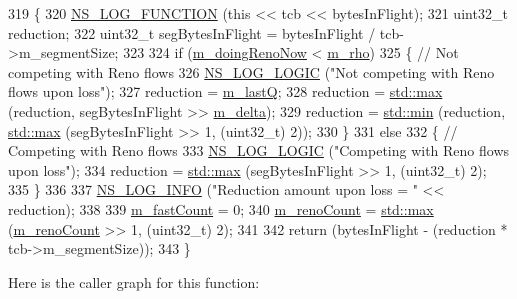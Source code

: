 \begin{DoxyCode}
319 \{
320   \hyperlink{log-macros-disabled_8h_a90b90d5bad1f39cb1b64923ea94c0761}{NS\_LOG\_FUNCTION} (\textcolor{keyword}{this} << tcb << bytesInFlight);
321   uint32\_t reduction;
322   uint32\_t segBytesInFlight = bytesInFlight / tcb->m\_segmentSize;
323 
324   \textcolor{keywordflow}{if} (\hyperlink{classns3_1_1TcpYeah_ad70d5e4310bd47c13bdfe5a665a4a911}{m\_doingRenoNow} < \hyperlink{classns3_1_1TcpYeah_ada328f61ed71f07744835de4bf78927c}{m\_rho})
325     \{ \textcolor{comment}{// Not competing with Reno flows}
326       \hyperlink{group__logging_ga88acd260151caf2db9c0fc84997f45ce}{NS\_LOG\_LOGIC} (\textcolor{stringliteral}{"Not competing with Reno flows upon loss"});
327       reduction = \hyperlink{classns3_1_1TcpYeah_a6bea8f785d16df35d447ba70b4464fb9}{m\_lastQ};
328       reduction = \hyperlink{80211b_8c_affe776513b24d84b39af8ab0930fef7f}{std::max} (reduction, segBytesInFlight >> \hyperlink{classns3_1_1TcpYeah_af36b0f4c1017a437469d909a22650f84}{m\_delta});
329       reduction = \hyperlink{80211b_8c_ac6afabdc09a49a433ee19d8a9486056d}{std::min} (reduction, \hyperlink{80211b_8c_affe776513b24d84b39af8ab0930fef7f}{std::max} (segBytesInFlight >> 1, (uint32\_t) 2));
330     \}
331   \textcolor{keywordflow}{else}
332     \{ \textcolor{comment}{// Competing with Reno flows}
333       \hyperlink{group__logging_ga88acd260151caf2db9c0fc84997f45ce}{NS\_LOG\_LOGIC} (\textcolor{stringliteral}{"Competing with Reno flows upon loss"});
334       reduction = \hyperlink{80211b_8c_affe776513b24d84b39af8ab0930fef7f}{std::max} (segBytesInFlight >> 1, (uint32\_t) 2);
335     \}
336 
337   \hyperlink{group__logging_gafbd73ee2cf9f26b319f49086d8e860fb}{NS\_LOG\_INFO} (\textcolor{stringliteral}{"Reduction amount upon loss = "} << reduction);
338 
339   \hyperlink{classns3_1_1TcpYeah_adec63c13d5f8b6677008aa5209437483}{m\_fastCount} = 0;
340   \hyperlink{classns3_1_1TcpYeah_a23724f2976fedf0c221ebad49a54487c}{m\_renoCount} = \hyperlink{80211b_8c_affe776513b24d84b39af8ab0930fef7f}{std::max} (\hyperlink{classns3_1_1TcpYeah_a23724f2976fedf0c221ebad49a54487c}{m\_renoCount} >> 1, (uint32\_t) 2);
341 
342   \textcolor{keywordflow}{return} (bytesInFlight - (reduction * tcb->m\_segmentSize));
343 \}
\end{DoxyCode}


Here is the caller graph for this function\+:


